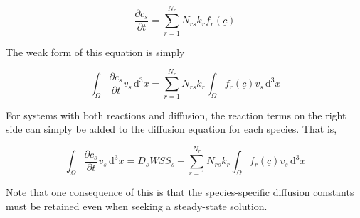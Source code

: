 \begin{equation}
\frac{\partial c_s}{\partial t} = 
\sum_{r=1}^{N_r} N_{rs} k_r f_r\left(\underline{c}\right)
\end{equation}

The weak form of this equation is simply

\begin{equation}
\int_\Omega \frac{\partial c_s}{\partial t} v_s \,\mathrm{d}^3x = 
\sum_{r=1}^{N_r} N_{rs} k_r \int_\Omega f_r\left(\underline{c}\right) v_s \,\mathrm{d}^3x
\end{equation}

For systems with both reactions and diffusion,
the reaction terms on the right side can simply be added to the diffusion
equation for each species. That is,

\begin{equation}
\int_\Omega \frac{\partial c_s}{\partial t} v_s \,\mathrm{d}^3x = 
D_s WSS_s +
\sum_{r=1}^{N_r} N_{rs} k_r \int_\Omega f_r\left(\underline{c}\right) v_s \,\mathrm{d}^3x
\end{equation}

Note that one consequence of this is that the species-specific diffusion constants
must be retained even when seeking a steady-state solution.